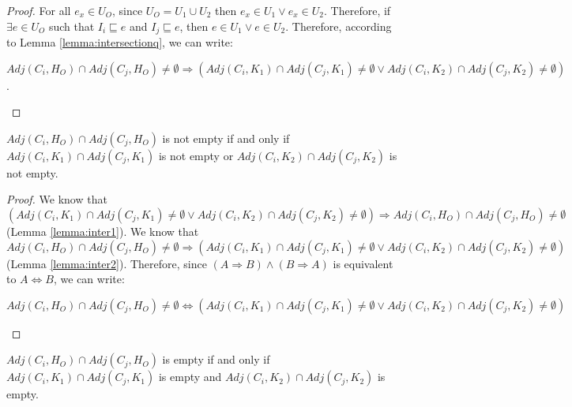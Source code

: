\begin{proof}
For all $e_{x} \in U_{O}$, since $U_{O} = U_{1} \cup U_{2}$ then $e_{x} \in U_{1} \vee e_{x} \in U_{2}$. Therefore, if $\exists e \in U_{O}$ such that $I_{i} \sqsubseteq e$ and $I_{j} \sqsubseteq e$, then $e \in U_{1} \vee e \in U_{2}$. Therefore, according to Lemma \ref{lemma:intersectionq}, we can write:

\begin{center}
$Adj(C_{i}, H_{O}) \cap Adj(C_{j}, H_{O}) \neq \emptyset \Rightarrow (Adj(C_{i}, K_{1}) \cap  Adj(C_{j}, K_{1}) \neq \emptyset \vee Adj(C_{i}, K_{2}) \cap Adj(C_{j}, K_{2}) \neq \emptyset)$.
\end{center}
\end{proof}

\begin{lemma}\label{lemma:inter}
$Adj(C_{i}, H_{O}) \cap Adj(C_{j}, H_{O})$ is not empty if and only if $Adj(C_{i}, K_{1}) \cap Adj(C_{j}, K_{1})$ is not empty or $Adj(C_{i}, K_{2}) \cap Adj(C_{j}, K_{2})$ is not empty.
\end{lemma}

\begin{proof}
We know that $(Adj(C_{i}, K_{1}) \cap Adj(C_{j}, K_{1}) \neq \emptyset \vee Adj(C_{i}, K_{2}) \cap Adj(C_{j}, K_{2}) \neq \emptyset) \Rightarrow Adj(C_{i}, H_{O}) \cap Adj(C_{j}, H_{O}) \neq \emptyset$ (Lemma \ref{lemma:inter1}).
We know that $Adj(C_{i}, H_{O}) \cap Adj(C_{j}, H_{O}) \neq \emptyset \Rightarrow (Adj(C_{i}, K_{1}) \cap Adj(C_{j}, K_{1}) \neq \emptyset \vee Adj(C_{i}, K_{2}) \cap Adj(C_{j}, K_{2}) \neq \emptyset)$ (Lemma \ref{lemma:inter2}). Therefore, since $(A \Rightarrow B) \wedge (B \Rightarrow A)$ is equivalent to $A \Leftrightarrow B$, we can write:

\begin{center}
$Adj(C_{i}, H_{O}) \cap Adj(C_{j}, H_{O}) \neq \emptyset \Leftrightarrow (Adj(C_{i}, K_{1}) \cap Adj(C_{j}, K_{1}) \neq \emptyset \vee Adj(C_{i}, K_{2}) \cap Adj(C_{j}, K_{2}) \neq \emptyset)$
\end{center}
\end{proof}

\begin{lemma}\label{lemma:Inter}
$Adj(C_{i}, H_{O}) \cap Adj(C_{j}, H_{O})$ is empty if and only if $Adj(C_{i}, K_{1}) \cap Adj(C_{j}, K_{1})$ is empty and $Adj(C_{i}, K_{2}) \cap Adj(C_{j}, K_{2})$ is empty.
\end{lemma}

